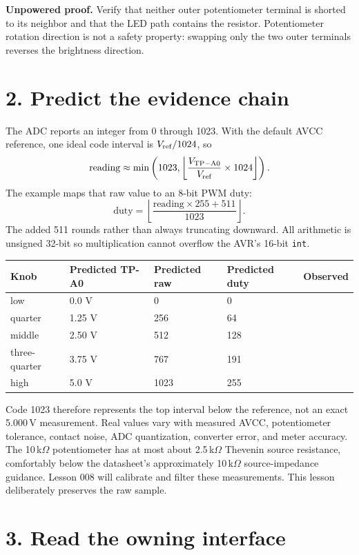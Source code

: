 \documentclass[11pt]{article}
\begin{document}
\textbf{Unpowered proof.} Verify that neither outer potentiometer terminal is
shorted to its neighbor and that the LED path contains the resistor.
Potentiometer rotation direction is not a safety property: swapping only the
two outer terminals reverses the brightness direction.

\section*{2. Predict the evidence chain}

The ADC reports an integer from 0 through 1023. With the default AVCC
reference, one ideal code interval is \(V_{\rm ref}/1024\), so
\[
    \text{reading} \approx
    \min\left(1023,
    \left\lfloor\frac{V_{\rm TP-A0}}{V_{\rm ref}}\times1024\right\rfloor
    \right).
\]
The example maps that raw value to an 8-bit PWM duty:
\[
    \text{duty} =
    \left\lfloor
        \frac{\text{reading}\times255+511}{1023}
    \right\rfloor .
\]
The added 511 rounds rather than always truncating downward. All arithmetic is
unsigned 32-bit so multiplication cannot overflow the AVR's 16-bit
\texttt{int}.

\begin{center}
\begin{tabularx}{0.94\linewidth}{@{}XXXXX@{}}
\toprule
Knob & Predicted TP-A0 & Predicted raw & Predicted duty & Observed\\
\midrule
low & 0.0 V & 0 & 0 & \\
quarter & 1.25 V & 256 & 64 & \\
middle & 2.50 V & 512 & 128 & \\
three-quarter & 3.75 V & 767 & 191 & \\
high & 5.0 V & 1023 & 255 & \\
\bottomrule
\end{tabularx}
\end{center}

Code 1023 therefore represents the top interval below the reference, not an
exact 5.000\,V measurement. Real values vary with measured AVCC, potentiometer
tolerance, contact noise, ADC quantization, converter error, and meter
accuracy. The 10\,k\(\Omega\) potentiometer has at most about
2.5\,k\(\Omega\) Thevenin source resistance, comfortably below the
datasheet's approximately 10\,k\(\Omega\) source-impedance guidance. Lesson
008 will calibrate and filter these measurements. This lesson deliberately
preserves the raw sample.

\section*{3. Read the owning interface}
\end{document}
